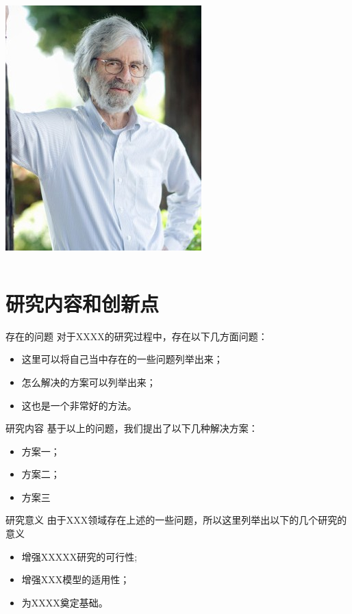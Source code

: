 \documentclass{beamer}
\begin{document}
\begin{frame}
\begin{columns}[T]
        \includegraphics[height=.3\textheight]{Lamport.jpg}
    \end{columns}
\end{frame}

\section{研究内容和创新点}

\begin{frame}{存在的问题}
    对于XXXX的研究过程中，存在以下几方面问题：
    \begin{itemize}
        \item 这里可以将自己当中存在的一些问题列举出来；
        \item 怎么解决的方案可以列举出来；
        \item 这也是一个非常好的方法。
    \end{itemize}
\end{frame}



\begin{frame}{研究内容}
    基于以上的问题，我们提出了以下几种解决方案：
    \begin{itemize}
        \item 方案一；
        \item 方案二；
        \item 方案三
    \end{itemize}
\end{frame}

\begin{frame}{研究意义}
    由于XXX领域存在上述的一些问题，所以这里列举出以下的几个研究的意义
    \begin{itemize}
        \item 增强XXXXX研究的可行性;
        \item 增强XXX模型的适用性；
        \item 为XXXX奠定基础。
    \end{itemize}
\end{frame}
\end{document}
